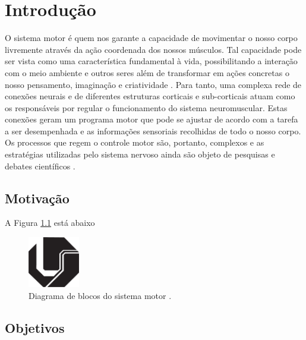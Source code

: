 
\chapter{Introdução}
\label{cap:introducao}
O sistema motor é quem nos garante a capacidade de movimentar o nosso corpo livremente através da ação coordenada dos nossos músculos. Tal capacidade pode ser vista como uma característica fundamental à vida, possibilitando a interação com o meio ambiente e outros seres além de transformar em ações concretas o nosso pensamento, imaginação e criatividade \cite{Kandel2013}. Para tanto, uma complexa rede de conexões neurais e de diferentes estruturas corticais e sub-corticais atuam como os responsáveis por regular o funcionamento do sistema neuromuscular. Estas conexões geram um programa motor que pode se ajustar de acordo com a tarefa a ser desempenhada e as informações sensoriais recolhidas de todo o nosso corpo. Os processos que regem o controle motor são, portanto, complexos e as estratégias utilizadas pelo sistema nervoso ainda são objeto de pesquisas e debates científicos \cite{Kandel2013, Lent2010, Guyton2006}.

\section{Motivação}

A Figura \ref{fig:figura1} está abaixo

\begin{figure}[!htbp]
\begin{center} 
\includegraphics[width = 0.2\textwidth]{img/logo_ufu.pdf}
\caption[Diagrama de blocos do sistema motor]{Diagrama de blocos do sistema motor \cite{Kandel2013}.}
\label{fig:figura1}
\end{center}
\end{figure}


\section{Objetivos}
